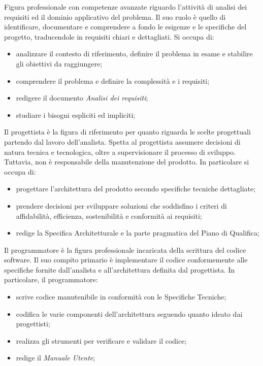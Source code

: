 Figura professionale con competenze avanzate riguardo l’attività di analisi dei requisiti ed il dominio applicativo del problema. Il suo ruolo è quello di identificare, documentare e comprendere a fondo le esigenze e le specifiche del progetto, traducendole in requisiti chiari e dettagliati. Si occupa di:
\begin{itemize}
	\item analizzare il contesto di riferimento, definire il problema in esame e stabilire gli obiettivi da raggiungere;
	\item comprendere il  problema e definire la complessità e i requisiti;
	\item redigere il documento \textit{Analisi dei requisiti};
	\item studiare i bisogni espliciti ed impliciti;
\end{itemize}
Il progettista è la figura di riferimento per quanto riguarda le scelte progettuali partendo dal lavoro dell’analista. Spetta al progettista assumere decisioni di natura tecnica e tecnologica, oltre a supervisionare il processo di sviluppo. Tuttavia, non è responsabile della manutenzione del prodotto.
In particolare si occupa di:
\begin{itemize}
	\item progettare l’architettura del prodotto secondo specifiche tecniche dettagliate;
	\item prendere decisioni per sviluppare soluzioni che soddisfino i criteri di affidabilità,
	      efficienza, sostenibilità e conformità ai requisiti;
	\item redige la Specifica Architetturale e la parte pragmatica del Piano di Qualifica;
\end{itemize}
Il programmatore è la figura professionale incaricata della scrittura del codice software. Il suo compito primario è implementare il codice conformemente alle specifiche fornite dall’analista e all’architettura definita dal progettista.
In particolare, il programmatore:
\begin{itemize}
	\item scrive codice manutenibile in conformità con le Specifiche Tecniche;
	\item codifica le varie componenti dell’architettura seguendo quanto ideato dai progettisti;
	\item realizza gli strumenti per verificare e validare il codice;
	\item redige il \textit{Manuale Utente};
\end{itemize}
